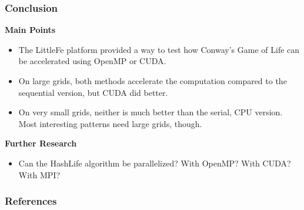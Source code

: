 \documentclass{beamer}
\begin{document}
\begin{frame}
	\frametitle{Conclusion}
	{\bf Main Points}
	\begin{itemize}
		\item The LittleFe platform provided a way to test how Conway's Game of
		Life can be accelerated using OpenMP or CUDA.
		\item On large grids, both methods accelerate the computation
		compared to the sequential version, but CUDA did better.
		\item On very small grids, neither is much better than the serial,
		CPU version.  Most interesting patterns need large grids,
		though.
	\end{itemize}

	{\bf Further Research}
	\begin{itemize}
		\item Can the HashLife algorithm be parallelized?  With OpenMP? With CUDA?
		With MPI?
	\end{itemize}
\end{frame}

\begin{frame}
\frametitle{References}
\nocite{gol}
\nocite{tm}
\nocite{cuda_prog_guide}
\nocite{wolfram}


\end{frame}
\end{document}

